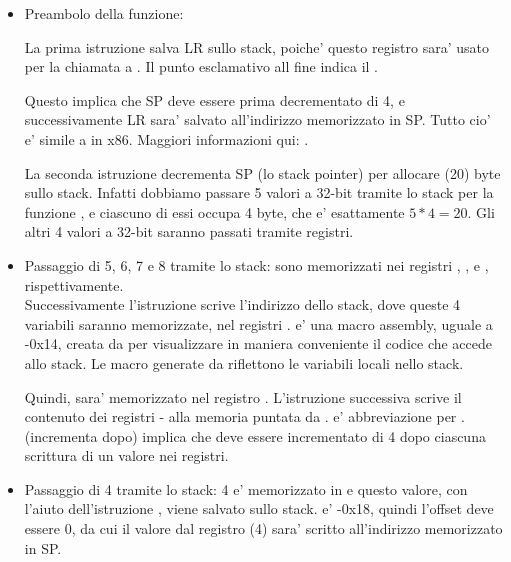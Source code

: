 \begin{itemize}
\item Preambolo della funzione:

La prima istruzione  salva \ac{LR} sullo stack, poiche' questo registro sara' usato per la chiamata a \printf.
Il punto esclamativo all fine indica il .

Questo implica che \ac{SP} deve essere prima decrementato di 4, e successivamente \ac{LR} sara' salvato all'indirizzo memorizzato in \ac{SP}.
Tutto cio' e' simile a \PUSH in x86.
Maggiori informazioni qui: .

La seconda istruzione  decrementa \ac{SP} (lo \gls{stack pointer}) per allocare  (20) byte sullo stack.
Infatti dobbiamo passare 5 valori a 32-bit tramite lo stack per la funzione \printf, e ciascuno di essi occupa 4 byte, che e' esattamente $5*4=20$.
Gli altri 4 valori a 32-bit saranno passati tramite registri.

\item Passaggio di 5, 6, 7 e 8 tramite lo stack: sono memorizzati nei registri , ,  e , rispettivamente.\\
Successivamente l'istruzione  scrive l'indirizzo dello stack, dove queste 4 variabili saranno memorizzate,
nel registri .
 e' una macro assembly, uguale a -0x14, creata da \IDA per visualizzare in maniera conveniente il codice che accede allo stack.
Le macro  generate da \IDA riflettono le variabili locali nello stack.

Quindi,  sara' memorizzato nel registro .
L'istruzione successiva  scrive il contenuto dei registri - alla memoria puntata da .
 e' abbreviazione per . 
 (incrementa dopo) implica che  deve essere incrementato di 4 dopo ciascuna scrittura di un valore nei registri.

\item Passaggio di 4 tramite lo stack: 4 e' memorizzato in  e questo valore, con l'aiuto dell'istruzione , viene salvato sullo stack.
 e' -0x18, quindi l'offset deve essere 0, da cui il valore dal registro  (4) sara' scritto all'indirizzo memorizzato in \ac{SP}.


\end{itemize}
